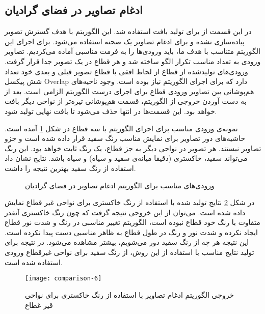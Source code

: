 \subsection{ادغام تصاویر در فضای گرادیان} \label{imageFusion}
در این قسمت از 
برای تولید بافت استفاده شد. این الگوریتم با هدف گسترش تصویر پیاده‌سازی‌ نشده و برای ادغام تصاویر یک صحنه استفاده می‌شود. برای اجرای این الگوریتم متناسب با هدف ما، باید ورودی‌ها را به فرمت مناسبی آماده می‌کردیم. تصاویر ورودی به تعداد مناسب تکرار الگو ساخته شد و هر قطاع در یک تصویر جدا قرار گرفت. ورودی‌های تولید‌شده از قطاع از لحاظ افقی با قطاع تصویر قبلی و بعدی خود تعداد شش پیکسل \gls{Overlap} دارد که برای اجرای الگوریتم نیاز بوده است. وجود ناحیه‌های هم‌پوشانی بین تصاویر ورودی قطاع برای اجرای درست الگوریتم الزامی است. بعد از به دست آوردن خروجی از الگوریتم، قسمت هم‌پوشانی تیره‌تر از نواحی دیگر بافت خواهد بود. این قسمت‌ها در انتها حذف می‌شود تا بافت نهایی تولید شود.

نمونه‌ی ورودی مناسب برای اجرای الگوریتم با سه قطاع در شکل \ref{properInputs1} آمده است. حاشیه‌های دور تصاویر برای نمایش مناسب رنگ سفید قرار داده شده است و جزو تصاویر نیستند. هر تصویر در نواحی دیگر به جز قطاع، یک رنگ ثابت خواهد بود. این رنگ می‌تواند سفید، خاکستری (دقیقا میانه‌ی سفید و سیاه) و سیاه باشد. نتایج نشان داد استفاده از رنگ سفید بهترین نتیجه را داشت.
\setlength{\fboxsep}{0pt}%
\begin{figure}[h!]
	\centering
	\qquad
	\qquad
	\caption{ورودی‌های مناسب برای الگوریتم ادغام تصاویر در فضای گرادیان}
	\label{properInputs1}
\end{figure}

 در شکل \ref{grayResult} نتایج تولید شده با استفاده از رنگ خاکستری برای نواحی غیر قطاع نمایش داده شده است. می‌توان از این خروجی نتیجه گرفت که چون رنگ خاکستری آنقدر متفاوت با رنگ خود قطاع نبوده است، الگوریتم تغییر مناسبی در رنگ و شدت نور قطاع ایجاد نکرده و شدت نور و رنگ در طول قطاع به ظاهر مناسبی دست پیدا نکرده است. این نتیجه هر چه از رنگ سفید دور می‌شویم، بیشتر مشاهده می‌شود. در نتیجه برای تولید نتایج مناسب با استفاده از این روش، از رنگ سفید برای نواحی غیرقطاع ورودی استفاده شده است. 
\begin{figure}[h!]
	\centering
	\texttt{[image: comparison-6]}
	\caption{خروجی الگوریتم ادغام تصاویر با استفاده از رنگ خاکستری برای نواحی قیر غطاع}
	\label{grayResult}
\end{figure}

